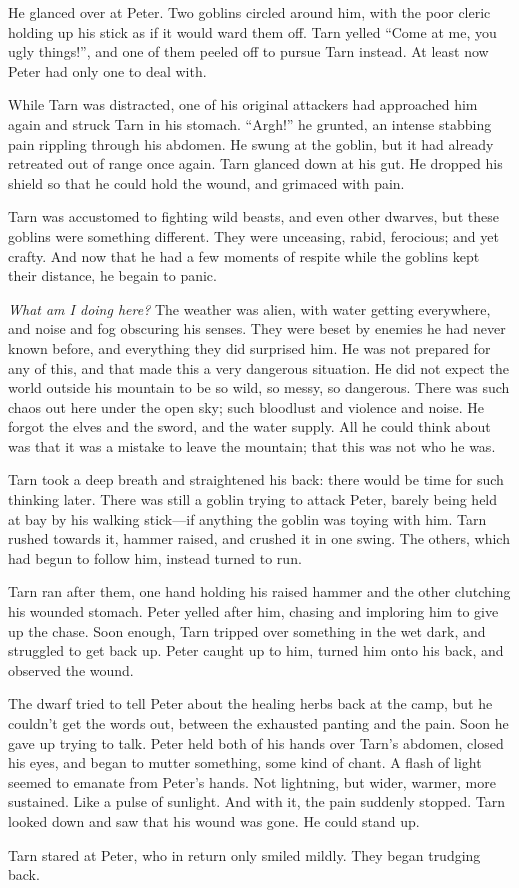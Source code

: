 He glanced over at Peter.  Two goblins circled around him, with the poor cleric holding up his stick as if it would ward them off.  Tarn yelled ``Come at me, you ugly things!'', and one of them peeled off to pursue Tarn instead.  At least now Peter had only one to deal with.

While Tarn was distracted, one of his original attackers had approached him again and struck Tarn in his stomach.  ``Argh!'' he grunted, an intense stabbing pain rippling through his abdomen.  He swung at the goblin, but it had already retreated out of range once again.  Tarn glanced down at his gut.  He dropped his shield so that he could hold the wound, and grimaced with pain.

Tarn was accustomed to fighting wild beasts, and even other dwarves, but these goblins were something different.  They were unceasing, rabid, ferocious; and yet crafty.  And now that he had a few moments of respite while the goblins kept their distance, he begain to panic.

\emph{What am I doing here?}  The weather was alien, with water getting everywhere, and noise and fog obscuring his senses.  They were beset by enemies he had never known before, and everything they did surprised him.  He was not prepared for any of this, and that made this a very dangerous situation.  He did not expect the world outside his mountain to be so wild, so messy, so dangerous.  There was such chaos out here under the open sky; such bloodlust and violence and noise.  He forgot the elves and the sword, and the water supply.  All he could think about was that it was a mistake to leave the mountain; that this was not who he was.

Tarn took a deep breath and straightened his back: there would be time for such thinking later.  There was still a goblin trying to attack Peter, barely being held at bay by his walking stick---if anything the goblin was toying with him.  Tarn rushed towards it, hammer raised, and crushed it in one swing.  The others, which had begun to follow him, instead turned to run.

Tarn ran after them, one hand holding his raised hammer and the other clutching his wounded stomach.  Peter yelled after him, chasing and imploring him to give up the chase.  Soon enough, Tarn tripped over something in the wet dark, and struggled to get back up.  Peter caught up to him, turned him onto his back, and observed the wound.

The dwarf tried to tell Peter about the healing herbs back at the camp, but he couldn't get the words out, between the exhausted panting and the pain.  Soon he gave up trying to talk.  Peter held both of his hands over Tarn's abdomen, closed his eyes, and began to mutter something, some kind of chant.  A flash of light seemed to emanate from Peter's hands.  Not lightning, but wider, warmer, more sustained.  Like a pulse of sunlight.  And with it, the pain suddenly stopped.  Tarn looked down and saw that his wound was gone.  He could stand up.

Tarn stared at Peter, who in return only smiled mildly.  They began trudging back.